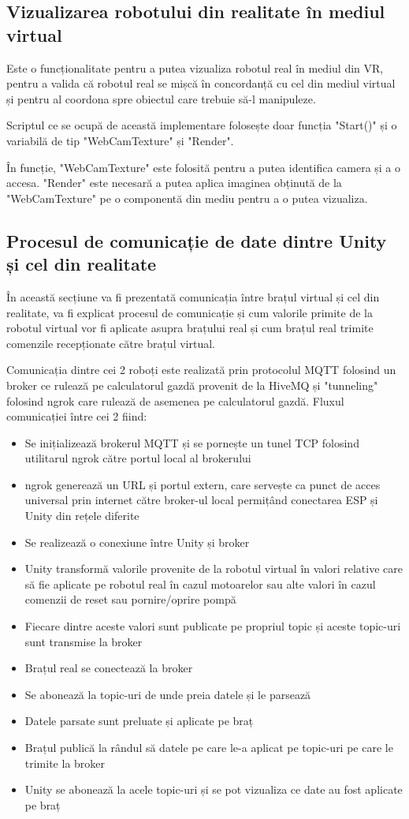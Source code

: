 \subsection{Vizualizarea robotului din realitate în mediul virtual}
Este o funcționalitate pentru a putea vizualiza robotul real în mediul din VR, pentru a  valida că robotul real se mișcă în concordanță cu cel din mediul virtual și pentru al coordona spre obiectul care trebuie să-l manipuleze. 

Scriptul ce se ocupă de această implementare folosește doar funcția "Start()" și o variabilă de tip "WebCamTexture" și "Render". 

În funcție,  "WebCamTexture" este folosită pentru a putea identifica camera și a o accesa. "Render" este necesară a putea aplica imaginea obținută de la "WebCamTexture" pe o componentă din mediu pentru a o putea vizualiza.


\subsection{Procesul de comunicație de date dintre Unity și cel din realitate}
În această secțiune va fi prezentată comunicația între brațul virtual și cel din realitate, va fi explicat procesul de comunicație și cum valorile primite de la robotul virtual vor fi aplicate asupra brațului real și cum brațul real trimite comenzile recepționate către brațul virtual.

Comunicația dintre cei 2 roboți este realizată prin protocolul MQTT folosind un broker ce rulează pe calculatorul gazdă provenit de la HiveMQ și "tunneling" folosind ngrok care rulează de asemenea pe calculatorul gazdă. Fluxul comunicației între cei 2 fiind:
\begin{itemize}
	\item Se inițializează brokerul MQTT  și se pornește un tunel TCP folosind utilitarul ngrok către portul local al brokerului
	\item ngrok generează un URL și portul extern, care servește ca punct de acces universal prin internet către broker-ul local permițând conectarea ESP și Unity din rețele diferite
	\item Se realizează o conexiune între Unity și broker
	\item Unity transformă valorile provenite de la robotul virtual în valori relative care să fie aplicate pe robotul real în cazul motoarelor sau alte valori în cazul comenzii de reset sau pornire/oprire pompă
	\item Fiecare dintre aceste valori sunt publicate pe propriul topic și aceste topic-uri sunt transmise la broker
	\item Brațul real se conectează la broker 
	\item Se abonează la topic-uri de unde preia datele și le parsează
	\item Datele parsate sunt preluate și aplicate pe braț
	\item Brațul publică la rândul să datele pe care le-a aplicat pe topic-uri pe care le trimite la broker
	\item Unity se abonează la acele topic-uri și se pot vizualiza ce date au fost aplicate pe braț
\end{itemize}

